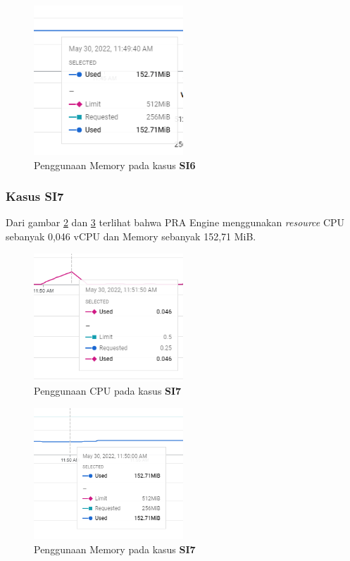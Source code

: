 \begin{figure}[!htb]
	\centering
	\includegraphics[width=0.5\textwidth]{resources/ch4/resource/6-mem.png}
	\caption{Penggunaan Memory pada kasus \textbf{SI6}}
	\label{result_mem_6}
\end{figure}

\pagebreak

\subsubsection{Kasus SI7}
Dari gambar \ref{result_cpu_7} dan \ref{result_mem_7} terlihat bahwa PRA Engine menggunakan \textit{resource} CPU sebanyak 0,046 vCPU dan Memory sebanyak 152,71 MiB. 

\begin{figure}[!htb]
	\centering
	\includegraphics[width=0.5\textwidth]{resources/ch4/resource/7-cpu.png}
	\caption{Penggunaan CPU pada kasus \textbf{SI7}}
	\label{result_cpu_7}
\end{figure}

\begin{figure}[!htb]
	\centering
	\includegraphics[width=0.5\textwidth]{resources/ch4/resource/7-mem.png}
	\caption{Penggunaan Memory pada kasus \textbf{SI7}}
	\label{result_mem_7}
\end{figure}

